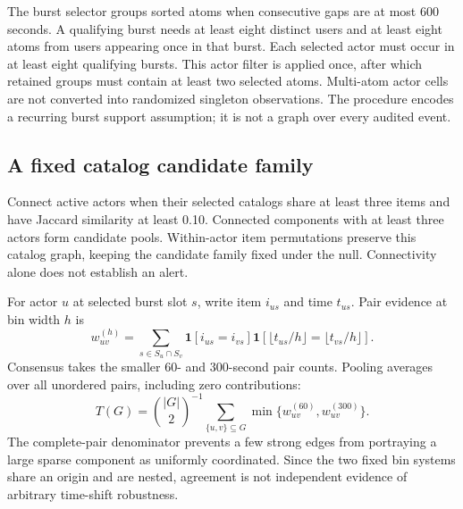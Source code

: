 \documentclass[11pt,letterpaper]{article}
\begin{document}
The burst selector groups sorted atoms when consecutive gaps are at most 600 seconds. A qualifying burst needs at least eight distinct users and at least eight atoms from users appearing once in that burst. Each selected actor must occur in at least eight qualifying bursts. This actor filter is applied once, after which retained groups must contain at least two selected atoms. Multi-atom actor cells are not converted into randomized singleton observations. The procedure encodes a recurring burst support assumption; it is not a graph over every audited event.

\subsection{A fixed catalog candidate family}
Connect active actors when their selected catalogs share at least three items and have Jaccard similarity at least 0.10. Connected components with at least three actors form candidate pools. Within-actor item permutations preserve this catalog graph, keeping the candidate family fixed under the null. Connectivity alone does not establish an alert.

For actor $u$ at selected burst slot $s$, write item $i_{us}$ and time $t_{us}$. Pair evidence at bin width $h$ is
\begin{equation}
w_{uv}^{(h)}=\sum_{s\in S_u\cap S_v}\mathbf1[i_{us}=i_{vs}]\mathbf1[\lfloor t_{us}/h\rfloor=\lfloor t_{vs}/h\rfloor].
\end{equation}
Consensus takes the smaller 60- and 300-second pair counts. Pooling averages over all unordered pairs, including zero contributions:
\begin{equation}
T(G)=\binom{|G|}{2}^{-1}\sum_{\{u,v\}\subseteq G}\min\{w_{uv}^{(60)},w_{uv}^{(300)}\}.
\end{equation}
The complete-pair denominator prevents a few strong edges from portraying a large sparse component as uniformly coordinated. Since the two fixed bin systems share an origin and are nested, agreement is not independent evidence of arbitrary time-shift robustness.
\end{document}

